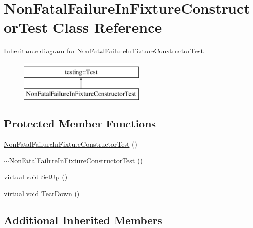 \hypertarget{class_non_fatal_failure_in_fixture_constructor_test}{\section{Non\-Fatal\-Failure\-In\-Fixture\-Constructor\-Test Class Reference}
\label{class_non_fatal_failure_in_fixture_constructor_test}
}
Inheritance diagram for Non\-Fatal\-Failure\-In\-Fixture\-Constructor\-Test\-:\begin{figure}[H]
\begin{center}
\leavevmode
\includegraphics[height=2.000000cm]{class_non_fatal_failure_in_fixture_constructor_test}
\end{center}
\end{figure}
\subsection*{Protected Member Functions}
\begin{DoxyCompactItemize}
\item 
\hyperlink{class_non_fatal_failure_in_fixture_constructor_test_a87a70e2b18b981c627c43f2af85a9345}{Non\-Fatal\-Failure\-In\-Fixture\-Constructor\-Test} ()
\item 
\hyperlink{class_non_fatal_failure_in_fixture_constructor_test_a732fa961c4bb68b3390e4a49a8375619}{$\sim$\-Non\-Fatal\-Failure\-In\-Fixture\-Constructor\-Test} ()
\item 
virtual void \hyperlink{class_non_fatal_failure_in_fixture_constructor_test_a7d951f8fbf7b2ac5046be8d8ee7b03d3}{Set\-Up} ()
\item 
virtual void \hyperlink{class_non_fatal_failure_in_fixture_constructor_test_ab76d79c346d9a378d625fde5739e8ad6}{Tear\-Down} ()
\end{DoxyCompactItemize}
\subsection*{Additional Inherited Members}


